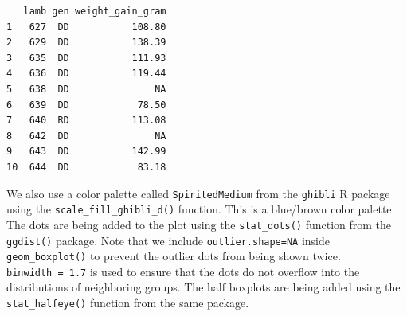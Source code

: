 \documentclass[
  letterpaper,
  DIV=11,
  numbers=noendperiod]{scrreprt}
\begin{document}
\begin{verbatim}
   lamb gen weight_gain_gram
1   627  DD           108.80
2   629  DD           138.39
3   635  DD           111.93
4   636  DD           119.44
5   638  DD               NA
6   639  DD            78.50
7   640  RD           113.08
8   642  DD               NA
9   643  DD           142.99
10  644  DD            83.18
\end{verbatim}

We also use a color palette called \texttt{SpiritedMedium} from the
\texttt{ghibli} R package using the \texttt{scale\_fill\_ghibli\_d()}
function. This is a blue/brown color palette. The dots are being added
to the plot using the \texttt{stat\_dots()} function from the
\texttt{ggdist()} package. Note that we include
\texttt{outlier.shape=NA} inside \texttt{geom\_boxplot()} to prevent the
outlier dots from being shown twice. \texttt{binwidth\ =\ 1.7} is used
to ensure that the dots do not overflow into the distributions of
neighboring groups. The half boxplots are being added using the
\texttt{stat\_halfeye()} function from the same package.
\end{document}

